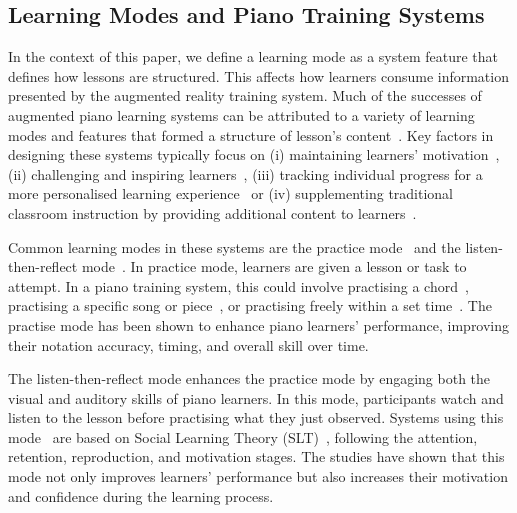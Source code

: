 \documentclass{vgtc}                          %
\begin{document}

\subsection{Learning Modes and Piano Training Systems}

\par In the context of this paper, we define a learning mode as a system feature that defines how lessons are structured. This affects how learners consume information presented by the augmented reality training system. Much of the successes of augmented piano learning systems can be attributed to a variety of learning modes and features that formed a structure of lesson's content~\cite{deja2022survey}. Key factors in designing these systems typically focus on (i) maintaining learners' motivation~\cite{weing2013piano, rogers2014piano, fernandez2016piano, molloy2019mixed, raymaekers2014game}, (ii) challenging and inspiring learners~\cite{cai2019designb, pan2018pilot}, (iii) tracking individual progress for a more personalised learning experience~\cite{das2017music, rodrigues2021personalization, weing2013piano} or (iv) supplementing traditional classroom instruction by providing additional content to learners~\cite{stryker1997content, chow2013music, guo2021hand, das2017music, stanbury2021holokeys}. 

\par Common learning modes in these systems are the practice mode~\cite{sun2018mr} and the listen-then-reflect mode~\cite{rogers2014piano, weing2013piano}. In practice mode, learners are given a lesson or task to attempt. In a piano training system, this could involve practising a chord~\cite{xiao2013mirrorfugue}, practising a specific song or piece~\cite{schmalstieg2007experiences, mcpherson2013space, pan2018pilot, molero2021novel}, or practising freely within a set time~\cite{takegawa2012piano, weing2013piano, rogers2014piano}. The practise mode has been shown to enhance piano learners' performance, improving their notation accuracy, timing, and overall skill over time. %

\par The listen-then-reflect mode %
enhances the practice mode by engaging both the visual and auditory skills of piano learners. In this mode, participants watch and listen to the lesson %
before practising what they just observed. Systems using this mode~\cite{weing2013piano, rogers2014piano, xiao2014andante} are based on Social Learning Theory (SLT)~\cite{bandura1977social}, %
following the attention, retention, reproduction, and motivation stages. The studies have shown that this mode not only improves learners' performance but %
also 
increases their motivation and confidence during the learning process.
\end{document}
